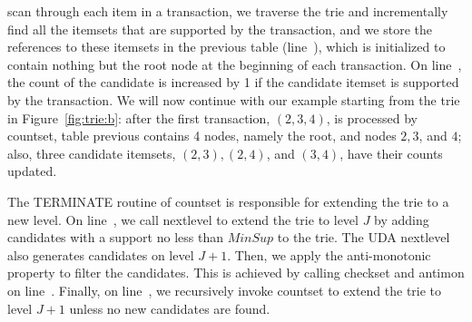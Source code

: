 {{scan through each item in a transaction, we traverse the trie and
incrementally find all the itemsets that are supported by the
transaction, and we store the references to these itemsets in the {\bw
  previous} table (line~), which is initialized to
contain nothing but the root node at the beginning of each
transaction. On line~, the count of the candidate
is increased by 1 if the candidate itemset is supported by the
transaction. We will now continue with our example starting from the
trie in Figure~\ref{fig:trie:b}: after the first transaction,
$(2,3,4)$, is processed by {\bw countset}, table {\bw previous}
contains 4 nodes, namely the root, and nodes $2,3$, and $4$; also,
three candidate itemsets, $(2,3), (2,4)$, and $(3,4)$, have their
counts updated.

The {\cw TERMINATE} routine of {\bw countset} is responsible for
extending the trie to a new level.  On line~, we call
{\bw nextlevel} to extend the trie to level $J$ by adding
candidates with a support no less than $MinSup$ to the trie.  The UDA {\bw
  nextlevel} also generates candidates on level $J+1$. Then, we apply
the anti-monotonic property to filter the candidates. This is
achieved by calling  {\bw checkset} and {\bw antimon} on
line~. Finally, on line~, we
recursively invoke {\bw countset} to extend the trie to level $J+1$
unless no new candidates are found.

{\renewcommand{\baselinestretch}{1}
\normalsize

}}}
